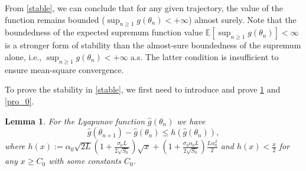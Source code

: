 \documentclass[standalone]{article}
\newtheorem{lem}{Lemma}[section]
\begin{document}
From \cref{stable}, we can conclude that for any given trajectory, the value of the function remains bounded  (\(\sup_{n \ge 1} g(\theta_{n}) < +\infty \)) almost surely. Note that the boundedness of the expected supremum function value $\mathbb{E}[\sup_{n \ge 1} g(\theta_n)] < \infty$ is a stronger form of stability than the almost-sure boundedness of the supremum alone, i.e., $\sup_{n \ge 1} g(\theta_n) < +\infty$ a.s. The latter condition is insufficient to ensure mean-square convergence.




To prove the stability in \cref{stable}, we first need to introduce and prove \cref{lem:adj:ghat} and \cref{pro_0}.
\begin{lem}\label{lem:adj:ghat}
For the Lyapunov function $\hat{g}(\theta_n)$ we have $$
\hat{g}(\theta_{n+1})-\hat{g}(\theta_{n})\leq h(\hat{g}(\theta_{n})),
$$ where $h(x):=\alpha_0\sqrt{2 L}\left(1 + \frac{\sigma_0 L}{2\sqrt{S_0}}\right)\sqrt{x} + \left(1  + \frac{\sigma_0\alpha_0 L}{2\sqrt{S_0}}\right)\frac{ L\alpha_0^2}{2}$ and  
$h(x) < \frac{x}{2}$ for any $x \geq C_0$ with some constants $C_0$.
\end{lem}
\end{document}
